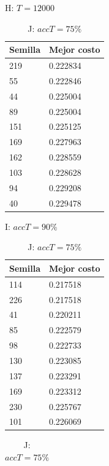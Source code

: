 \documentclass{article}
\begin{document}
\begin{table}[!htb]
    \begin{minipage}{.5\linewidth}
      \centering
      \caption{H: $T = 12000$}
      \begin{tabular}{l|l}
        Semilla & Mejor costo \\
        \hline
        219     & 0.222834 \\
        \hline
        55      & 0.222846 \\
        \hline
        44      & 0.225004 \\
        \hline
        89      & 0.225004 \\
        \hline
        151     & 0.225125 \\
        \hline
        169     & 0.227963 \\
        \hline
        162     & 0.228559 \\
        \hline
        103     & 0.228628 \\
        \hline
        94      & 0.229208 \\
        \hline
        40      & 0.229478 \\
      \end{tabular}
    \end{minipage}
    \begin{minipage}{.5\linewidth}
      \centering
      \caption{I: $accT = 90 \%$}
      \begin{tabular}{l|l}
        Semilla & Mejor costo \\
        \hline
        114     & 0.217518 \\
        \hline
        226     & 0.217518 \\
        \hline
        41      & 0.220211 \\
        \hline
        85      & 0.222579 \\
        \hline
        98      & 0.222733 \\
        \hline
        130     & 0.223085 \\
        \hline
        137     & 0.223291 \\
        \hline
        169     & 0.223312 \\
        \hline
        230     & 0.225767 \\
        \hline
        101     & 0.226069 \\
      \end{tabular}
    \end{minipage}
    \begin{minipage}{\linewidth}
      \centering
      \caption{J: $accT = 75 \%$}
      \begin{tabular}{l|l}

\end{tabular}
\end{minipage}
\end{table}
\end{document}
